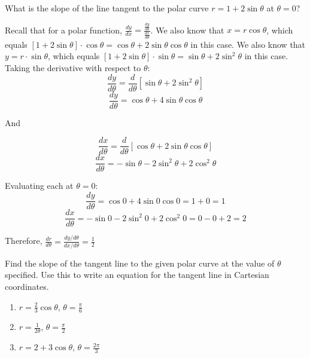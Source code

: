 \begin{Exercise} What is the slope of the line 
tangent to the polar curve $r = 1 + 2\sin{\theta}$ at $\theta = 0$?
\vspace{50mm}
\end{Exercise}

\begin{Answer}[ref = polar1]
Recall that for a polar function, $\frac{dy}{dx} = \frac{\frac{dy}{d\theta}}{
\frac{dx}{d\theta}}$. We also know that $x = r \cos{\theta}$, which equals 
$\left[ 1 + 2\sin{\theta} \right] \cdot \cos{\theta} = \cos{\theta} + 2\sin{
\theta}\cos{\theta}$ in this case. We also know that $y = r \cdot \sin{\theta}$, 
which equals $\left[ 1 + 2 \sin{\theta} \right] \cdot \sin{\theta} = \sin{
\theta} + 2 \sin^2{\theta}$ in this case. Taking the derivative with respect 
to $\theta$:
$$\frac{dy}{d\theta} = \frac{d}{d\theta} \left[ \sin{\theta} + 2 \sin^2{\theta} 
\right]$$
$$\frac{dy}{d\theta} = \cos{\theta} + 4\sin{\theta}\cos{\theta}$$

And

$$\frac{dx}{d\theta} = \frac{d}{d\theta} \left[ \cos{\theta} + 2\sin{\theta}\cos{
\theta} \right]$$
$$\frac{dx}{d\theta} = -\sin{\theta} - 2\sin^2{\theta} + 2\cos^2{\theta}$$

Evaluating each at $\theta = 0$:
$$\frac{dy}{d\theta} = \cos{0} + 4\sin{0}\cos{0} = 1 + 0 = 1$$
$$\frac{dx}{d\theta} = -\sin{0} - 2\sin^2{0} + 2\cos^2{0} = 0 - 0 + 2 = 2$$

Therefore, $\frac{dr}{d\theta} = \frac{dy/d\theta}{dx/d\theta} = \frac{1}{2}$
\end{Answer}

\begin{Exercise}[label = polar3]
Find the slope of the tangent line to the given polar curve at the value of 
$\theta$ specified. Use this to write an equation for the tangent line in 
Cartesian coordinates. 
\begin{enumerate}
\item $r = \frac{2}{3}\cos{\theta}$, $\theta = \frac{\pi}{6}$
\item $r = \frac{1}{2\theta}$, $\theta = \frac{\pi}{2}$
\item $r = 2 + 3\cos{\theta}$, $\theta = \frac{2\pi}{3}$
\end{enumerate}
\vspace{120mm}
\end{Exercise}

